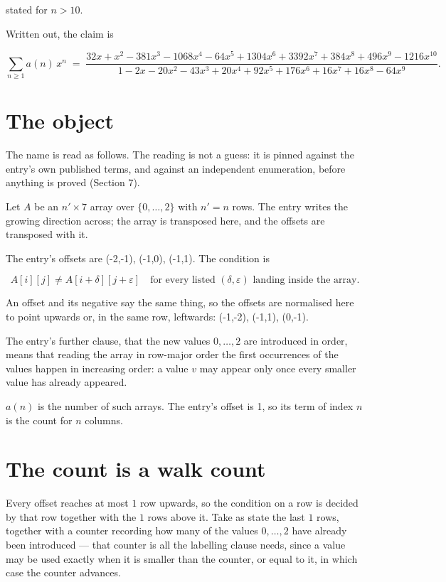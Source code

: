 \documentclass[11pt]{article}
\theoremstyle{definition}
\begin{document}
stated for $n > 10$.

Written out, the claim is

\[\sum_{n \ge 1} a(n)\,x^n \;=\; \frac{32x + x^{2} - 381x^{3} - 1068x^{4} - 64x^{5} + 1304x^{6} + 3392x^{7} + 384x^{8} + 496x^{9} - 1216x^{10}}{1 - 2x - 20x^{2} - 43x^{3} + 20x^{4} + 92x^{5} + 176x^{6} + 16x^{7} + 16x^{8} - 64x^{9}}.\]

\section{The object}

The name is read as follows. The reading is not a guess: it is pinned against the entry's own published terms, and against an independent enumeration, before anything is proved (Section 7).

Let $A$ be an $n' \times 7$ array over $\{0,\dots,2\}$ with $n' = n$ rows. The entry writes the growing direction across; the array is transposed here, and the offsets are transposed with it.

The entry's offsets are (-2,-1), (-1,0), (-1,1). The condition is

\[A[i][j] \ne A[i{+}\delta][j{+}\varepsilon]\quad\text{for every listed }(\delta,\varepsilon)\text{ landing inside the array.}\]

An offset and its negative say the same thing, so the offsets are normalised here to point upwards or, in the same row, leftwards: (-1,-2), (-1,1), (0,-1).

The entry's further clause, that the new values $0,\dots,2$ are introduced in order, means that reading the array in row-major order the first occurrences of the values happen in increasing order: a value $v$ may appear only once every smaller value has already appeared.

$a(n)$ is the number of such arrays. The entry's offset is 1, so its term of index $n$ is the count for $n$ columns.

\section{The count is a walk count}

Every offset reaches at most $1$ row upwards, so the condition on a row is decided by that row together with the $1$ rows above it. Take as state the last $1$ rows, together with a counter recording how many of the values $0,\dots,2$ have already been introduced --- that counter is all the labelling clause needs, since a value may be used exactly when it is smaller than the counter, or equal to it, in which case the counter advances.
\end{document}
